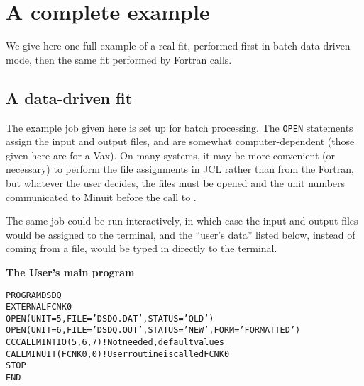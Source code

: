  
\chapter{A complete example}
 
We give here one full example of a real fit, performed first in batch
data-driven mode, then the same fit performed by Fortran calls.

\section{A data-driven fit}

The example job given here is set up for batch processing.
The \texttt{OPEN} statements assign the input and output files, and are
somewhat computer-dependent (those given here are for a Vax).
On many systems, it may be more convenient (or necessary)
to perform the file assignments in JCL rather than from the Fortran,
but whatever the user decides,
the files must be opened and the unit numbers
communicated to Minuit before the call to .
 
The same job could be run interactively, in which case the input
and output files would be assigned to the terminal,
and the ``user's data'' listed below, instead of coming from a file,
would be typed in directly to the terminal.

\begin{center}\small\textbf{The User's main program}\end{center}
\begin{alltt}\footnotesize
      PROGRAM DSDQ
      EXTERNAL FCNK0
      OPEN (UNIT=5,FILE='DSDQ.DAT',STATUS='OLD')
      OPEN (UNIT=6,FILE='DSDQ.OUT',STATUS='NEW',FORM='FORMATTED')
CC      CALL MINTIO(5,6,7)   ! Not needed, default values
      CALL MINUIT(FCNK0,0)   ! User routine is called FCNK0
      STOP
      END
\end{alltt}

